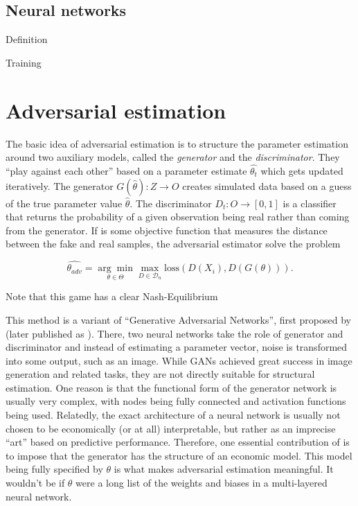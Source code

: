 \subsection{Neural networks}
\label{sec:neural_networks}

Definition

Training

\section{Adversarial estimation}
\label{sec:adversarial_estimation}

The basic idea of adversarial estimation is to structure the parameter estimation around two auxiliary models, called the \textit{generator} and the \textit{discriminator}.
They ``play against each other'' based on a parameter estimate $\hat{\theta_{t}}$ which gets updated iteratively. 
The generator $G(\hat{\theta}) : Z \rightarrow O$ creates simulated data based on a guess of the true parameter value $\hat{\theta}$.
The discriminator $D_t : O \rightarrow [0 , 1]$ is a classifier that returns the probability of a given observation being real rather than coming from the generator.
If  is some objective function that measures the distance between the fake and real samples, the adversarial estimator solve the problem
 
\begin{equation}
\label{eq:adversarial_estimator}
    \hat{\theta_{adv}} = \underset{\theta \in \Theta}{\arg \min } \max _{D \in \mathcal{D}_n} \text{loss}(D(X_i), D(G(\theta))).
\end{equation}

Note that this game has a clear Nash-Equilibrium

This method is a variant of ``Generative Adversarial Networks'', first proposed by \textcite{goodfellow2014generative} (later published as \textcite{goodfellow2020generative}).
There, two neural networks take the role of generator and discriminator and instead of estimating a parameter vector, noise is transformed into some output, such as an image.
While GANs achieved great success in image generation and related tasks, %
they are not directly suitable for structural estimation.
One reason is that the functional form of the generator network is usually very complex, with nodes being fully connected and activation functions being used.
Relatedly, the exact architecture of a neural network is usually not chosen to be economically (or at all) interpretable, but rather as an imprecise ``art'' based on predictive performance.
Therefore, one essential contribution of \textcite{kaji2023adversarial} is to impose that the generator has the structure of an economic model.
This model being fully specified by $\theta$ is what makes adversarial estimation meaningful.
It wouldn't be if $\theta$ were a long list of the weights and biases in a multi-layered neural network.

